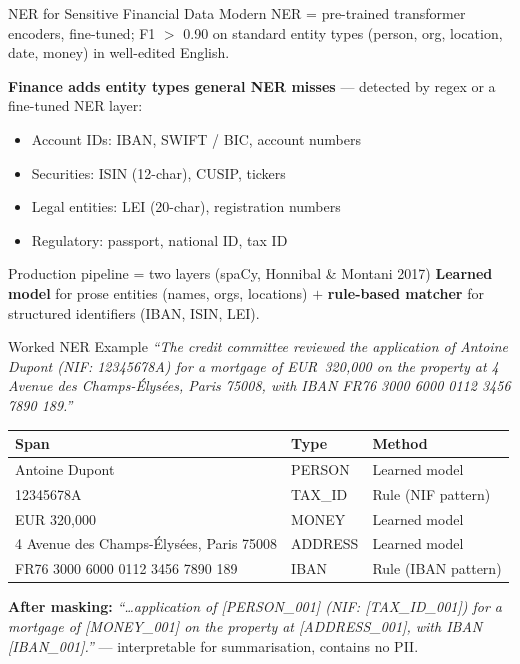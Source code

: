 \documentclass[9pt,t]{beamer}
\begin{document}
\begin{frame}{NER for Sensitive Financial Data}
Modern NER = pre-trained transformer encoders, fine-tuned; F1 $>$ 0.90 on standard
entity types (person, org, location, date, money) in well-edited English.

\medskip
\textbf{Finance adds entity types general NER misses} --- detected by regex or a
fine-tuned NER layer:
\begin{itemize}
  \item Account IDs: IBAN, SWIFT / BIC, account numbers
  \item Securities: ISIN (12-char), CUSIP, tickers
  \item Legal entities: LEI (20-char), registration numbers
  \item Regulatory: passport, national ID, tax ID
\end{itemize}

\medskip
\begin{block}{Production pipeline = two layers (spaCy, Honnibal \& Montani 2017)}
\textbf{Learned model} for prose entities (names, orgs, locations) $+$
\textbf{rule-based matcher} for structured identifiers (IBAN, ISIN, LEI).
\end{block}
\end{frame}

\begin{frame}{Worked NER Example}
\footnotesize
\emph{``The credit committee reviewed the application of Antoine Dupont (NIF:
12345678A) for a mortgage of EUR~320{,}000 on the property at 4 Avenue des
Champs-\'Elys\'ees, Paris 75008, with IBAN FR76 3000 6000 0112 3456 7890 189.''}

\medskip
\begin{tabular}{lll}
\toprule
Span & Type & Method \\
\midrule
Antoine Dupont & PERSON & Learned model \\
12345678A & TAX\_ID & Rule (NIF pattern) \\
EUR 320,000 & MONEY & Learned model \\
4 Avenue des Champs-\'Elys\'ees, Paris 75008 & ADDRESS & Learned model \\
FR76 3000 6000 0112 3456 7890 189 & IBAN & Rule (IBAN pattern) \\
\bottomrule
\end{tabular}

\medskip
\normalsize
\textbf{After masking:} \emph{``\ldots application of [PERSON\_001] (NIF:
[TAX\_ID\_001]) for a mortgage of [MONEY\_001] on the property at [ADDRESS\_001],
with IBAN [IBAN\_001].''} --- interpretable for summarisation, contains no PII.
\end{frame}
\end{document}
